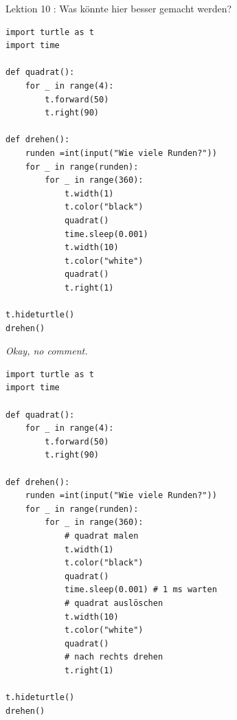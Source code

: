 \begin{frame}[fragile]{Lektion 10}
: Was könnte hier besser gemacht werden?\\[-.5cm]
\begin{minipage}[t]{.49\textwidth}
    \begin{lstlisting}[basicstyle=\tiny\ttfamily]
import turtle as t
import time

def quadrat():
    for _ in range(4):
        t.forward(50)
        t.right(90)

def drehen():
    runden =int(input("Wie viele Runden?"))
    for _ in range(runden):
        for _ in range(360):
            t.width(1)
            t.color("black")
            quadrat()
            time.sleep(0.001)
            t.width(10)
            t.color("white")
            quadrat()
            t.right(1)

t.hideturtle()
drehen()
\end{lstlisting}
    \begin{center}
         \textit{Okay, no comment.}
    \end{center}
\end{minipage}
\begin{minipage}[t]{.49\textwidth}
    \begin{lstlisting}[basicstyle=\tiny\ttfamily]
import turtle as t
import time

def quadrat():
    for _ in range(4):
        t.forward(50)
        t.right(90)

def drehen():
    runden =int(input("Wie viele Runden?"))
    for _ in range(runden):
        for _ in range(360):
            # quadrat malen
            t.width(1)
            t.color("black")
            quadrat()
            time.sleep(0.001) # 1 ms warten
            # quadrat auslöschen
            t.width(10)
            t.color("white")
            quadrat()
            # nach rechts drehen
            t.right(1)

t.hideturtle()
drehen()
\end{lstlisting}
\end{minipage}
\end{frame}

